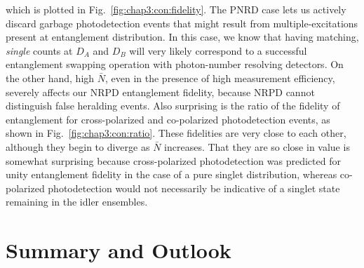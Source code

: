 \documentclass[aps,twocolumn,secnumarabic,amsmath,amssymb,pra,groupedaddress,
showpacs, showkeys]{revtex4-1}
\begin{document}
which is plotted in Fig.~\ref{fig:chap3:con:fidelity}. The PNRD case lets us
actively discard garbage photodetection events that might result from
multiple-excitations present at entanglement distribution. In this case, we
know that having matching, \emph{single} counts at $D_A$ and $D_B$ will very
likely correspond to a successful entanglement swapping operation with
photon-number resolving detectors. On the other hand, high $\bar{N}$, even in
the presence of high measurement efficiency, severely affects our NRPD
entanglement fidelity, because NRPD cannot distinguish false heralding
events. Also surprising is the ratio of the fidelity of entanglement for
cross-polarized and co-polarized photodetection events, as shown in
Fig.~\ref{fig:chap3:con:ratio}. These fidelities are very close to each other,
although they begin to diverge as $\bar{N}$ increases. That they are so close
in value is somewhat surprising because cross-polarized photodetection was
predicted for unity entanglement fidelity in the case of a pure singlet
distribution, whereas co-polarized photodetection would not necessarily be
indicative of a singlet state remaining in the idler ensembles.


\section{Summary and Outlook~\label{chap:conclusion}}
\end{document}
